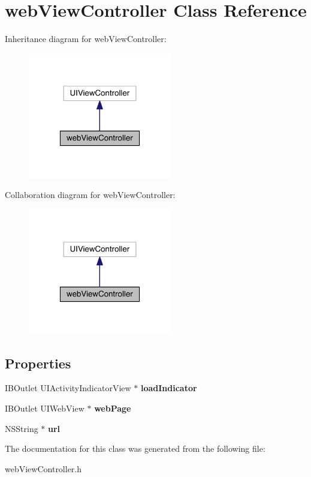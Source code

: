 \section{web\+View\+Controller Class Reference}
\label{interfaceweb_view_controller}


Inheritance diagram for web\+View\+Controller\+:
\nopagebreak
\begin{figure}[H]
\begin{center}
\leavevmode
\includegraphics[width=178pt]{interfaceweb_view_controller__inherit__graph}
\end{center}
\end{figure}


Collaboration diagram for web\+View\+Controller\+:
\nopagebreak
\begin{figure}[H]
\begin{center}
\leavevmode
\includegraphics[width=178pt]{interfaceweb_view_controller__coll__graph}
\end{center}
\end{figure}
\subsection*{Properties}
\begin{DoxyCompactItemize}
\item 
I\+B\+Outlet U\+I\+Activity\+Indicator\+View $\ast$ {\bfseries load\+Indicator}\label{interfaceweb_view_controller_aed50ed21f737cd77446aca759e3ab5a7}

\item 
I\+B\+Outlet U\+I\+Web\+View $\ast$ {\bfseries web\+Page}\label{interfaceweb_view_controller_a0a973d91b25a215ef7df7b9e5e6ad860}

\item 
N\+S\+String $\ast$ {\bfseries url}\label{interfaceweb_view_controller_a6b63e34b44fea86498e7c602ee3700a9}

\end{DoxyCompactItemize}


The documentation for this class was generated from the following file\+:\begin{DoxyCompactItemize}
\item 
web\+View\+Controller.\+h\end{DoxyCompactItemize}
